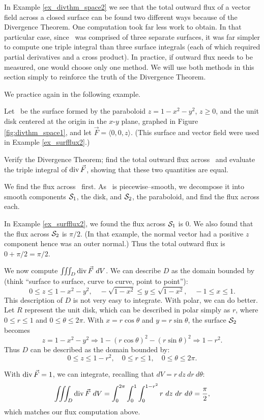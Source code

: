 In Example \ref{ex_divthm_space2} we see that the total outward flux of a vector field across a closed surface can be found two different ways because of the Divergence Theorem. One computation took far less work to obtain. In that particular case, since \surfaceS\ was comprised of three separate surfaces, it was far simpler to compute one triple integral than three surface integrals (each of which required partial derivatives and a cross product). In practice, if outward flux needs to be measured, one would choose only one method. We will use both methods in this section simply to reinforce the truth of the Divergence Theorem.

We practice again in the following example.\\
\enlargethispage{2\baselineskip}

{Let \surfaceS\ be the surface formed by the paraboloid $z=1-x^2-y^2$, $z\geq 0$, and the unit disk centered at the origin in the $x$-$y$ plane, graphed in Figure \ref{fig:divthm_space1}, and let $\vec F = \langle 0,0,z\rangle$. (This surface and vector field were used in Example \ref{ex_surfflux2}.)


Verify the Divergence Theorem; find the total outward flux across \surfaceS\ and evaluate the triple integral of $\operatorname{div} \vec F$, showing that these two quantities are equal.
}
{We find the flux across \surfaceS\ first. As \surfaceS\ is piecewise--smooth, we decompose it into smooth components $\mathcal{S}_1$, the disk, and $\mathcal{S}_2$, the paraboloid, and find the flux across each.

In Example \ref{ex_surfflux2}, we found the flux across $\mathcal{S}_1$ is 0. We also found that the flux across $\mathcal{S}_2$ is $\pi/2$. (In that example, the normal vector had a positive $z$ component hence was an outer normal.) Thus the total outward flux is $0+\pi/2 = \pi/2$.

We now compute $\iiint_D \divv \vec F\ dV$. We can describe $D$ as the domain bounded by (think ``surface to surface, curve to curve, point to point''):
$$0\leq z\leq 1-x^2-y^2, \quad -\sqrt{1-x^2}\leq y\leq \sqrt{1-x^2},\quad -1\leq x\leq 1.$$
This description of $D$ is not very easy to integrate. With polar, we can do better. Let $R$ represent the unit disk, which can be described in polar simply as $r$, where $0\leq r\leq 1$ and $0\leq \theta\leq 2\pi$. With $x=r\cos \theta$ and $y=r\sin\theta$, the surface $\mathcal{S}_2$ becomes
$$z=1-x^2-y^2 \Rightarrow 1-(r\cos\theta)^2-(r\sin\theta)^2 \Rightarrow 1-r^2.$$ Thus $D$ can be described as the domain bounded by:
$$0\leq z\leq 1-r^2,\quad 0\leq r\leq 1,\quad 0\leq \theta\leq 2\pi.$$

With $\operatorname{div} \vec F = 1$, we can integrate, recalling that $dV = r\ dz\ dr\ d\theta$:
$$\iiint_D\operatorname{div} \vec F\ dV = \int_0^{2\pi}\int_0^1\int_0^{1-r^2} r\ dz\ dr\ d\vartheta = \frac{\pi}2,$$
which matches our flux computation above.
}\\

